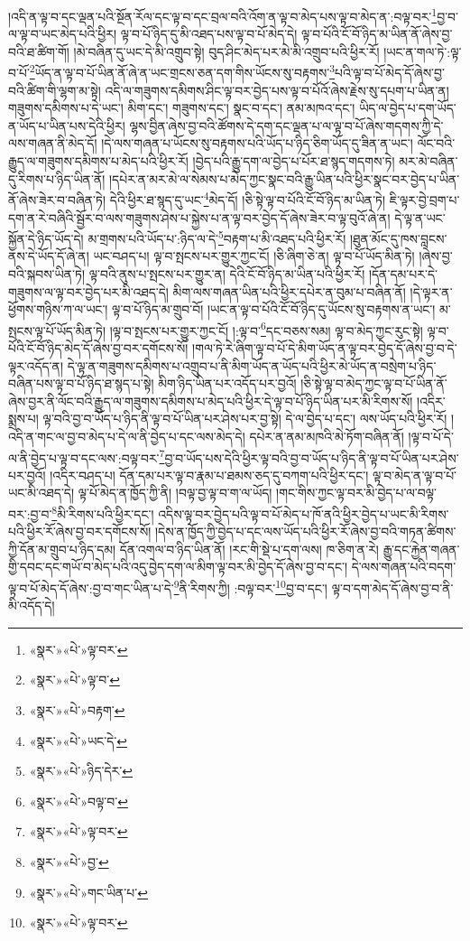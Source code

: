 །འདི་ན་ལྟ་བ་དང་ལྡན་པའི་སྔོན་རོལ་དང་ལྟ་བ་དང་བྲལ་བའི་འོག་ན་ལྟ་བ་མེད་པས་ལྟ་བ་མེད་ན་:བལྟ་བར་\footnote{«སྣར་»«པེ་»ལྟ་བར་}བྱ་བ་ལ་ལྟ་བ་ཡང་མེད་པའི་ཕྱིར། ལྟ་བ་པོ་ཉིད་དུ་མི་འཐད་པས་ལྟ་བ་པོ་མེད་དེ། ལྟ་བ་པོའི་ངོ་བོ་ཉིད་མ་ཡིན་ནོ་ཞེས་བྱ་བའི་ཐ་ཚིག་གོ། །མེ་བཞིན་དུ་ཡང་དེ་མི་འགྲུབ་སྟེ། བུད་ཤིང་མེད་པར་མེ་མི་འགྲུབ་པའི་ཕྱིར་རོ། །ཡང་ན་གལ་ཏེ་:ལྟ་བ་པོ་\footnote{«སྣར་»«པེ་»ལྟ་བ་}ཡོད་ན་ལྟ་བ་པོ་ཡིན་ནོ་ཞེ་ན་ཡང་གྲངས་ཅན་དག་གིས་ཡོངས་སུ་བརྟགས་\footnote{«སྣར་»«པེ་»བརྟག་}པའི་ལྟ་བ་པོ་མེད་དོ་ཞེས་བྱ་བའི་ཚིག་གི་ལྷག་མ་སྟེ། འདི་ལ་གཟུགས་དམིགས་ཤིང་ལྟ་བར་བྱེད་པས་ལྟ་བ་པོའོ་ཞེས་རྗེས་སུ་དཔག་པ་ཡིན་ན། གཟུགས་དམིགས་པ་དེ་ཡང་། མིག་དང་། གཟུགས་དང་། སྣང་བ་དང་། ནམ་མཁའ་དང་། ཡིད་ལ་བྱེད་པ་དག་ཡོད་ན་ཡོད་པ་ཡིན་པས་དེའི་ཕྱིར། ལྷས་བྱིན་ཞེས་བྱ་བའི་ཚོགས་དེ་དག་དང་ལྡན་པ་ལ་ལྟ་བ་པོ་ཞེས་གདགས་ཀྱི་དེ་ལས་གཞན་ནི་མེད་དོ། །དེ་ལས་གཞན་པ་ཡོངས་སུ་བརྟགས་པའི་ཡོད་པ་ཉིད་ཅིག་ཡོད་དུ་ཟིན་ན་ཡང་། ལོང་བའི་རྒྱུད་ལ་གཟུགས་དམིགས་པ་མེད་པའི་ཕྱིར་རོ། །བྱེད་པའི་རྒྱུ་དག་ལ་བྱེད་པ་པོར་ཐ་སྙད་གདགས་ཏེ། མར་མེ་བཞིན་དུ་རིགས་པ་ཉིད་ཡིན་ནོ། །དཔེར་ན་མར་མེ་ལ་སེམས་པ་མེད་ཀྱང་སྣང་བའི་རྒྱུ་ཡིན་པའི་ཕྱིར་སྣང་བར་བྱེད་པ་ཡིན་ནོ་ཞེས་ཟེར་བ་བཞིན་ཏེ། དེའི་ཕྱིར་ཐ་སྙད་དུ་ཡང་\footnote{«སྣར་»«པེ་»ཡང་དེ་}མེད་དོ། །ཅི་སྟེ་ལྟ་བ་པོའི་ངོ་བོ་ཉིད་མ་ཡིན་ཏེ། ཇི་ལྟར་བྱེ་བྲག་པ་དག་ན་རེ་བཞིའི་སྦྱོར་བ་ལས་གཟུགས་ཤེས་པ་སྐྱེས་པ་ན་ལྟ་བར་བྱེད་དོ་ཞེས་ཟེར་བ་ལྟ་བུའོ་ཞེ་ན། དེ་ལྟ་ན་ཡང་སྐྱོན་དེ་ཉིད་ཡོད་དེ། མ་གྲགས་པའི་ཡོད་པ་:ཉིད་ལ་དེ་\footnote{«སྣར་»«པེ་»ཉིད་དེར་}བརྟག་པ་མི་འཐད་པའི་ཕྱིར་རོ། །ཐུན་མོང་དུ་ཁས་བླངས་ནས་དེ་ཡོད་དོ་ཞེ་ན། ཡང་བཤད་པ། ལྟ་བ་སྤངས་པར་གྱུར་ཀྱང་ངོ། །ཅི་ཞིག་ཅེ་ན། ལྟ་བ་པོ་ཡོད་མིན་ཏེ། །ཞེས་བྱ་བའི་སྐབས་ཡིན་ཏེ། ལྟ་བའི་ནུས་པ་སྤངས་པར་གྱུར་ན། དེའི་ངོ་བོ་ཉིད་མ་ཡིན་པའི་ཕྱིར་རོ། །དོན་དམ་པར་དེ་གཟུགས་ལ་ལྟ་བར་བྱེད་པར་མི་འཐད་དེ། མིག་ལས་གཞན་ཡིན་པའི་ཕྱིར་དཔེར་ན་བུམ་པ་བཞིན་ནོ། །དེ་ལྟར་ན་ཕྱོགས་གཉིས་ཀ་ལ་ཡང་། ལྟ་བ་པོ་ཉིད་མ་གྲུབ་བོ། །ཡང་ན་ལྟ་བ་པོའི་ངོ་བོ་ཉིད་དུ་ཡོངས་སུ་བརྟགས་ན་ཡང་། མ་སྤངས་ལྟ་པོ་ཡོད་མིན་ཏེ། །ལྟ་བ་སྤངས་པར་གྱུར་ཀྱང་ངོ། །:ལྟ་བ་\footnote{«སྣར་»«པེ་»བལྟ་བ་}དང་བཅས་སམ། ལྟ་བ་མེད་ཀྱང་རུང་སྟེ། ལྟ་བ་པོའི་ངོ་བོ་ཉིད་མེད་དོ་ཞེས་བྱ་བར་དགོངས་སོ། །གལ་ཏེ་རེ་ཞིག་ལྟ་བ་པོ་དེ་མིག་ཡོད་ན་ལྟ་བར་བྱེད་དོ་ཞེས་བྱ་བ་དེ་ལྟར་འདོད་ན། དེ་ལྟ་ན་གཟུགས་དམིགས་པ་འགྲུབ་པ་ནི་མིག་ཡོད་ན་ཡོད་པའི་ཕྱིར་མེ་ཡོད་ན་བསྲེག་པ་ཉིད་བཞིན་པས་ལྟ་བ་པོ་ཉིད་ཐ་སྙད་པ་སྟེ། མིག་ཉིད་ཡིན་པར་འདོད་པར་བྱའོ། །ཅི་སྟེ་ལྟ་བ་མེད་ཀྱང་ལྟ་བ་པོ་ཡིན་ནོ་ཞེས་བྱར་ནི་ལོང་བའི་རྒྱུད་ལ་གཟུགས་དམིགས་པ་མེད་པའི་ཕྱིར་དེ་ལྟ་བ་པོ་ཉིད་ཡིན་པར་མི་རིགས་སོ། །འདིར་སྨྲས་པ། ལྟ་བའི་བྱ་བ་ཡོད་པ་ཉིད་ནི་ལྟ་བ་པོ་ཡིན་པར་ཤེས་པར་བྱ་སྟེ། དེ་ལ་བྱེད་པ་དང་། ལས་ཡོད་པའི་ཕྱིར་རོ། །འདི་ན་གང་ལ་བྱ་བ་མེད་པ་དེ་ལ་ནི་བྱེད་པ་དང་ལས་མེད་དེ། དཔེར་ན་ནམ་མཁའི་མེ་ཏོག་བཞིན་ནོ། །ལྟ་བ་པོ་དེ་ལ་ནི་བྱེད་པ་ལྟ་བ་དང་ལས་:བལྟ་བར་\footnote{«སྣར་»«པེ་»ལྟ་བར་}བྱ་བ་ཡོད་པས་དེའི་ཕྱིར་ལྟ་བའི་བྱ་བ་ཡོད་པ་ཉིད་ནི་ལྟ་བ་པོ་ཡིན་པར་ཤེས་པར་བྱའོ། །འདིར་བཤད་པ། དོན་དམ་པར་ལྟ་བ་རྣམ་པ་ཐམས་ཅད་དུ་བཀག་པའི་ཕྱིར་དང་། ལྟ་བ་མེད་ན་ལྟ་བ་པོ་ཡང་མི་འཐད་དེ། ལྟ་པོ་མེད་ན་ཁྱོད་ཀྱི་ནི། །བལྟ་བྱ་ལྟ་བ་ག་ལ་ཡོད། །གང་གིས་ཀྱང་ལྟ་བར་མི་བྱེད་པ་ལ་བལྟ་བར་:བྱ་བ་\footnote{«སྣར་»«པེ་»བྱ་}མི་རིགས་པའི་ཕྱིར་དང་། འདིས་ལྟ་བར་བྱེད་པའི་ལྟ་བ་པོ་མེད་པ་ཁོ་ནའི་ཕྱིར་བྱེད་པ་ཡང་མི་རིགས་པའི་ཕྱིར་རོ་ཞེས་བྱ་བར་དགོངས་སོ། །དེས་ན་ཁྱོད་ཀྱི་བྱེད་པ་དང་ལས་ཡོད་པའི་ཕྱིར་རོ་ཞེས་བྱ་བའི་གཏན་ཚིགས་ཀྱི་དོན་མ་གྲུབ་པ་ཉིད་དམ། དོན་འགལ་བ་ཉིད་ཡིན་ནོ། །རང་གི་སྡེ་པ་དག་ལས། ཁ་ཅིག་ན་རེ། རྒྱུ་དང་རྐྱེན་གཞན་གྱི་དབང་དང་གཡོ་བ་མེད་པའི་འདུ་བྱེད་དག་ལ་མིག་ལྟ་བར་མི་བྱེད་དོ་ཞེས་བྱ་བ་དང་། དེ་ལས་གཞན་པའི་བདག་ལྟ་བ་པོ་མེད་དོ་ཞེས་:བྱ་བ་གང་ཡིན་པ་དེ་\footnote{«སྣར་»«པེ་»གང་ཡིན་པ་}ནི་རིགས་ཀྱི། :བལྟ་བར་\footnote{«སྣར་»«པེ་»ལྟ་བར་}བྱ་བ་དང་། ལྟ་བ་དག་མེད་དོ་ཞེས་བྱ་བ་ནི་མི་འདོད་དེ། 